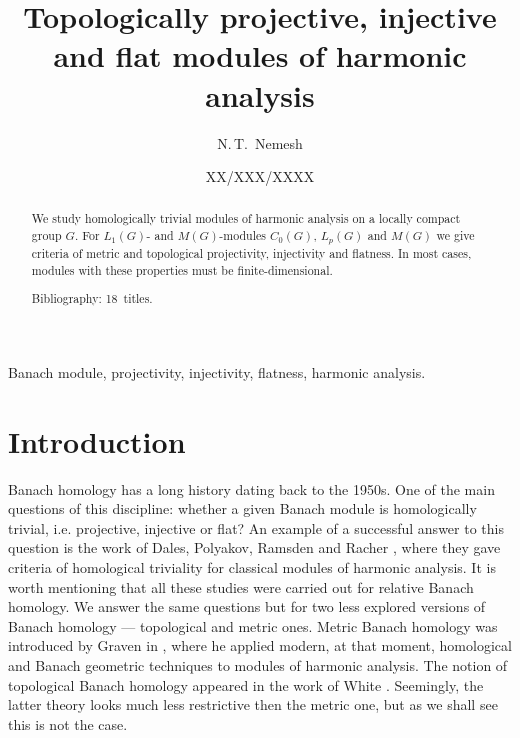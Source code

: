 \documentclass{article}
\theoremstyle{plain}
\theoremstyle{definition}
\begin{document}
\title{Topologically projective, injective and flat modules of harmonic analysis}
\author[Norbert~T.~Nemesh]{N.\,T.~Nemesh}
\address{Faculty of Mechanics and Mathematics,\\
Moscow State University}


\date{XX/XXX/XXXX}


\maketitle


\begin{fulltext}

\begin{abstract}
We study homologically trivial modules of harmonic analysis on a locally 
compact group $G$. For $L_1(G)$- and $M(G)$-modules $C_0(G)$, $L_p(G)$ and 
$M(G)$ we give criteria of metric and topological projectivity, injectivity 
and flatness. In most cases, modules with these properties must be 
finite-dimensional.

Bibliography: 18~titles.
\end{abstract}

\begin{keywords}
Banach module, projectivity, injectivity, flatness, harmonic analysis.
\end{keywords}



\section{Introduction}
\label{SectionIntroduction}

Banach homology has a long history dating back to the 1950s. One of the main 
questions of this discipline: whether a given Banach module is homologically trivial, 
i.e. projective, injective or flat? An example of a successful answer to this 
question is the work of Dales, Polyakov, Ramsden and Racher 
\cite{DalPolHomolPropGrAlg, RamsHomPropSemgroupAlg,RachInjModAndAmenGr}, where 
they gave criteria of homological triviality for classical modules of harmonic 
analysis. It is worth mentioning that all these studies were carried out for 
relative Banach homology. We answer the same questions but for two less explored 
versions of Banach homology --- topological and metric ones. Metric Banach homology 
was introduced by Graven in \cite{GravInjProjBanMod}, where he applied modern, 
at that moment, homological and Banach geometric techniques to modules of 
harmonic analysis. The notion of topological Banach homology appeared in the work 
of White \cite{WhiteInjmoduAlg}. Seemingly, the latter theory looks much less 
restrictive then the metric one, but as we shall see this is not the case.


\end{fulltext}
\end{document}
